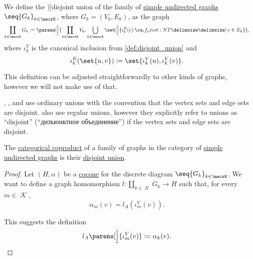 \begin{definition}\label{def:graph_disjoint_union}\mimprovised
  We define the \term[ru=дизъюнктное объедиение (графов) (\cite[19]{ЕмеличевИПр1990ТеорияГрафов})]{disjoint union} of the family of \hyperref[def:undirected_graph]{simple undirected graphs} \( \seq{ G_k }_{k \in \mscrK} \), where \( G_k = (V_k, E_k) \), as the graph
  \begin{equation*}
    \coprod_{k \in \mscrK} G_k \coloneqq \parens[\Big]{ \coprod_{k \in \mscrK} V_k, \bigcup_{k \in \mscrK} \set[\Big]{ \iota_k^E(e) \given* e \in E_k } },
  \end{equation*}
  where \( \iota_k^V \) is the canonical inclusion from \cref{def:disjoint_union} and
  \begin{equation*}
    \iota_k^E(\set{ u, v }) \coloneqq \set{ \iota_k^V(u), \iota_k^V(v) }.
  \end{equation*}
\end{definition}
\begin{comments}
  \item This definition can be adjusted straightforwardly to other kinds of graphs, however we will not make use of that.
  \item {}, ,  and  use ordinary unions with the convention that the vertex sets and edge sets are disjoint.  also use regular unions, however they explicitly refer to unions as \enquote{disjoint} (\enquote{дизъюнктное объединение}) if the vertex sets and edge sets are disjoint.
\end{comments}

\begin{proposition}\label{thm:undirected_graph_coproduct}
  The \hyperref[def:discrete_category_limits]{categorical coproduct} of a family of graphs in the category of \hyperref[def:undirected_graph]{simple undirected graphs} is their \hyperref[def:graph_disjoint_union]{disjoint union}.
\end{proposition}
\begin{proof}
  Let \( (H, \alpha) \) be a \hyperref[def:category_of_cones/cocone]{cocone} for the discrete diagram \( \seq{ G_k }_{k \in \mscrK} \). We want to define a graph homomorphism \( l: \coprod_{k \in \mscrK} G_k \to H \) such that, for every \( m \in \mscrK \),
  \begin{equation*}
    \alpha_m(v) = l_A(\iota^V_m(v)).
  \end{equation*}

  This suggests the definition
  \begin{equation*}
    l_A\parens[\Big]{ \iota^V_m(v) } \coloneqq \alpha_k(v).
  \end{equation*}
\end{proof}

